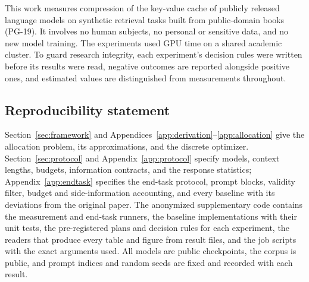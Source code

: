 \documentclass{article}
\theoremstyle{definition}
\begin{document}
This work measures compression of the key-value cache of publicly released language models on synthetic retrieval tasks built from public-domain books (PG-19).  It involves no human subjects, no personal or sensitive data, and no new model training.  The experiments used GPU time on a shared academic cluster.  To guard research integrity, each experiment's decision rules were written before its results were read, negative outcomes are reported alongside positive ones, and estimated values are distinguished from measurements throughout.

\subsection*{Reproducibility statement}

Section~\ref{sec:framework} and Appendices~\ref{app:derivation}--\ref{app:allocation} give the allocation problem, its approximations, and the discrete optimizer.  Section~\ref{sec:protocol} and Appendix~\ref{app:protocol} specify models, context lengths, budgets, information contracts, and the response statistics; Appendix~\ref{app:endtask} specifies the end-task protocol, prompt blocks, validity filter, budget and side-information accounting, and every baseline with its deviations from the original paper.  The anonymized supplementary code contains the measurement and end-task runners, the baseline implementations with their unit tests, the pre-registered plans and decision rules for each experiment, the readers that produce every table and figure from result files, and the job scripts with the exact arguments used.  All models are public checkpoints, the corpus is public, and prompt indices and random seeds are fixed and recorded with each result.




\clearpage
\appendix

\end{document}
